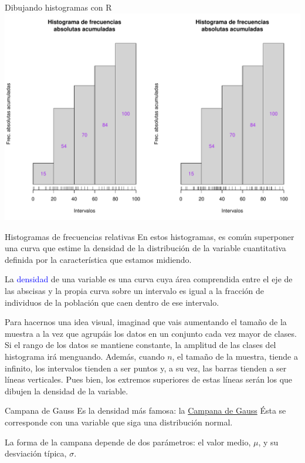 \documentclass[
  ignorenonframetext,
  aspectratio=169]{beamer}
\newcommand\blue[1]{\textcolor{blue}{#1}}
\begin{document}
\begin{frame}{Dibujando histogramas con R}
\protect\hypertarget{dibujando-histogramas-con-r-9}{}
\includegraphics{Hora6_files/figure-beamer/unnamed-chunk-49-1.pdf}
\end{frame}

\begin{frame}{Histogramas de frecuencias relativas}
\protect\hypertarget{histogramas-de-frecuencias-relativas}{}
En estos histogramas, es común superponer una curva que estime la
densidad de la distribución de la variable cuantitativa definida por la
característica que estamos midiendo.

La \blue{densidad} de una variable es una curva cuya área comprendida
entre el eje de las abscisas y la propia curva sobre un intervalo es
igual a la fracción de individuos de la población que caen dentro de ese
intervalo.

Para hacernos una idea visual, imaginad que vais aumentando el tamaño de
la muestra a la vez que agrupáis los datos en un conjunto cada vez mayor
de clases. Si el rango de los datos se mantiene constante, la amplitud
de las clases del histograma irá menguando. Además, cuando \(n\), el
tamaño de la muestra, tiende a infinito, los intervalos tienden a ser
puntos y, a su vez, las barras tienden a ser líneas verticales. Pues
bien, los extremos superiores de estas líneas serán los que dibujen la
densidad de la variable.
\end{frame}

\begin{frame}{Campana de Gauss}
\protect\hypertarget{campana-de-gauss}{}
Es la densidad más famosa: la
\href{https://es.wikipedia.org/wiki/Función_gaussiana}{Campana de Gauss}
Ésta se corresponde con una variable que siga una distribución normal.

La forma de la campana depende de dos parámetros: el valor medio,
\(\mu\), y su desviación típica, \(\sigma\).
\end{frame}
\end{document}
